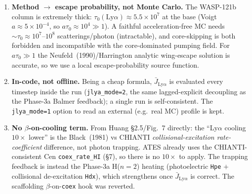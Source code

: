 \documentclass[english,a4paper]{kiseon_memo}
\begin{document}
\begin{enumerate}
\item \textbf{Method \(\to\) escape probability, not Monte Carlo.} The WASP-121b
column is extremely thick: \(\tau_0(\mathrm{Ly}\alpha)\approx5.5\times10^{7}\) at the
base (Voigt \(a\approx5\times10^{-4}\), so \(a\tau_0\approx10^{4}\gg1\)). A faithful
acceleration-free MC needs \(\sim\tau_0\approx10^{7}\)--\(10^{8}\)
scatterings/photon (intractable), and core-skipping is both forbidden and
incompatible with the core-dominated pumping field. For \(a\tau_0\gg1\) the
Neufeld~(1990)/Harrington analytic wing-escape solution is accurate, so we use a
local escape-probability source function.
\item \textbf{In-code, not offline.} Being a cheap formula, \(\bar J_{\mathrm{Ly}\alpha}\)
is evaluated every timestep inside the run (\texttt{jlya\_mode=2}, the same
lagged-explicit decoupling as the Phase-3a Balmer feedback); a single run is
self-consistent. The \texttt{jlya\_mode=1} option to read an external (e.g.\ real
MC) profile is kept.
\item \textbf{No \(\beta\)-on-cooling term.} From Huang \S2.5/Fig.~7 directly: the
``Ly\(\alpha\) cooling \(10\times\) lower'' is the Black~(1981) vs CHIANTI
\emph{collisional-excitation rate-coefficient} difference, not photon trapping.
ATES already uses the CHIANTI-consistent Cen \texttt{coex\_rate\_HI} (\S7), so there
is no \(10\times\) to apply. The trapping feedback is instead the Phase-3a H(\(n{=}2\))
heating (photoelectric \texttt{Hpe} \(+\) collisional de-excitation \texttt{Hdx}),
which strengthens once \(\bar J_{\mathrm{Ly}\alpha}\) is correct. The scaffolding
\(\beta\)-on-\texttt{coex} hook was reverted.
\end{enumerate}
\end{document}
